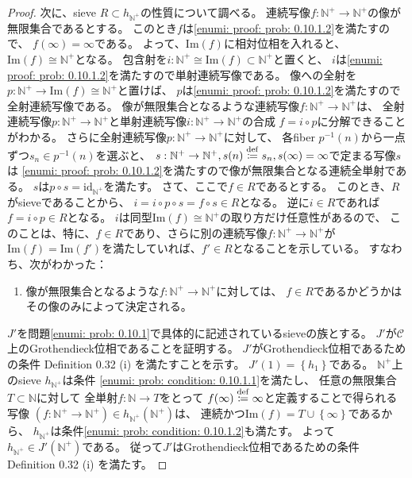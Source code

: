\documentclass[uplatex]{jsarticle}
\theoremstyle{definition}
\def\id{\mathrm{id}}
\newcommand{\im}{\mathrm{Im}}
\def\N{\mathbb{N}}
\def\mcC{\mathcal{C}}
\newcommand{\dfn}{\overset{\mathrm{\tiny def}}{\coloneqq}}
\begin{document}
\begin{proof}
  次に、sieve \(R\subset h_{\N^+}\)の性質について調べる。
  連続写像\(f:\N^+\to \N^+\)の像が無限集合であるとする。
  このとき\(f\)は\ref{enumi: proof: prob: 0.10.1.2}を満たすので、
  \(f(\infty) = \infty\)である。
  よって、\(\im(f)\)に相対位相を入れると、\(\im(f)\cong \N^+\)となる。
  包含射を\(i :\N^+\cong \im(f) \subset \N^+\)と置くと、
  \(i\)は\ref{enumi: proof: prob: 0.10.1.2}を満たすので単射連続写像である。
  像への全射を\(p:\N^+ \to \im(f) \cong \N^+\)と置けば、
  \(p\)は\ref{enumi: proof: prob: 0.10.1.2}を満たすので全射連続写像である。
  像が無限集合となるような連続写像\(f:\N^+\to \N^+\)は、
  全射連続写像\(p:\N^+\to \N^+\)と単射連続写像\(i:\N^+\to \N^+\)の合成
  \(f = i\circ p\)に分解できることがわかる。
  さらに全射連続写像\(p:\N^+\to \N^+\)に対して、
  各fiber \(p^{-1}(n)\)から一点ずつ\(s_n\in p^{-1}(n)\)を選ぶと、
  \(s:\N^+\to \N^+ , s(n) \dfn s_n, s(\infty) = \infty\)で定まる写像\(s\)は
  \ref{enumi: proof: prob: 0.10.1.2}を満たすので像が無限集合となる連続全単射である。
  \(s\)は\(p\circ s = \id_{\N^+}\)を満たす。
  さて、ここで\(f\in R\)であるとする。
  このとき、\(R\)がsieveであることから、
  \(i = i\circ p \circ s = f\circ s \in R\)となる。
  逆に\(i\in R\)であれば
  \(f = i\circ p \in R\)となる。
  \(i\)は同型\(\im(f)\cong \N^+\)の取り方だけ任意性があるので、
  このことは、特に、\(f\in R\)であり、さらに別の連続写像\(f:\N^+\to \N^+\)が
  \(\im(f) = \im (f')\)を満たしていれば、\(f'\in R\)となることを示している。
  すなわち、次がわかった：
  \begin{enumerate}[label=(\fnsymbol*),start=2]
    \item \label{enumi: proof: prob: 0.10.1 infinite}
    像が無限集合となるような\(f:\N^+\to \N^+\)に対しては、
    \(f\in R\)であるかどうかはその像のみによって決定される。
  \end{enumerate}

  \(J'\)を問題\ref{enumi: prob: 0.10.1}で具体的に記述されているsieveの族とする。
  \(J'\)が\(\mcC\)上のGrothendieck位相であることを証明する。
  \(J'\)がGrothendieck位相であるための条件 Definition 0.32 (i) を満たすことを示す。
  \(J'(1) = \left\{ h_1\right\}\)である。
  \(\N^+\)上のsieve \(h_{\N^+}\)は条件
  \ref{enumi: prob: condition: 0.10.1.1}を満たし、
  任意の無限集合\(T\subset \N\)に対して
  全単射\(f:\N\to T\)をとって
  \(f(\infty) \dfn \infty\)と定義することで得られる写像
  \((f:\N^+\to \N^+)\in h_{\N^+}(\N^+)\)は、
  連続かつ\(\im(f) = T\cup \left\{ \infty\right\}\)であるから、
  \(h_{\N^+}\)は条件\ref{enumi: prob: condition: 0.10.1.2}も満たす。
  よって\(h_{\N^+}\in J'(\N^+)\)である。
  従って\(J'\)はGrothendieck位相であるための条件 Definition 0.32 (i) を満たす。


\end{proof}
\end{document}
